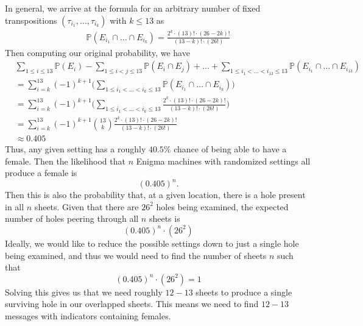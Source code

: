 \noindent In general, we arrive at the formula for an arbitrary
number of fixed transpositions $(\tau_{i_1}, \dots, \tau_{i_k})$ with
$k \le 13$ as
\begin{align*}
  \mathbb{P}(E_{i_1}\cap\dots\cap E_{i_k}) = \frac{2^k\cdot
  (13)!\cdot(26-2k)!}{(13-k)!\cdot(26!)}
\end{align*}
Then computing our original probability, we have
\begin{align*}
  & \sum_{1 \le i \le 13}\mathbb{P}(E_i) - \sum_{1\le i < j \le
  13}\mathbb{P}(E_i\cap E_j) + \dots + \sum_{1\le i_1 < \dots <i_{13}
  \le 13}\mathbb{P}(E_{i_1}\cap\dots\cap E_{i_{13}})                \\
  & = \sum_{i=k}^{13}(-1)^{k+1}\biggl(\sum_{1\le i_1 < \dots < i_k
  \le 13}\mathbb{P}(E_{i_1}\cap\dots\cap E_{i_k})\biggr)
  \\
  & = \sum_{i=k}^{13}(-1)^{k+1}\biggl(\sum_{1\le i_1 < \dots < i_k
  \le 13}\frac{2^k\cdot (13)!\cdot(26-2k)!}{(13-k)!\cdot(26!)}\biggr)
  \\
  & = \sum_{i=k}^{13}(-1)^{k+1}{13\choose k}\frac{2^k\cdot
  (13)!\cdot(26-2k)!}{(13-k)!\cdot(26!)}
  \\
  & \approx 0.405
\end{align*}
\noindent Thus, any given setting has a roughly $40.5\%$ chance of
being able to have a female. Then the likelihood that $n$ Enigma
machines with randomized settings all produce a female is
\[
  (0.405)^n.
\]
Then this is also the probability that, at a given location, there is
a hole present in all $n$ sheets. Given that there are $26^2$ holes
being examined, the expected number of holes peering through all $n$ sheets is
\[
  (0.405)^n\cdot(26^2)
\]
Ideally, we would like to reduce the possible settings down to just a
single hole being examined, and thus we would need to find the number
of sheets $n$ such that
\[
  (0.405)^n\cdot(26^2) = 1
\]
Solving this gives us that we need roughly $12-13$ sheets to produce
a single surviving hole in our overlapped sheets. This means we need
to find $12-13$ messages with indicators containing females.

